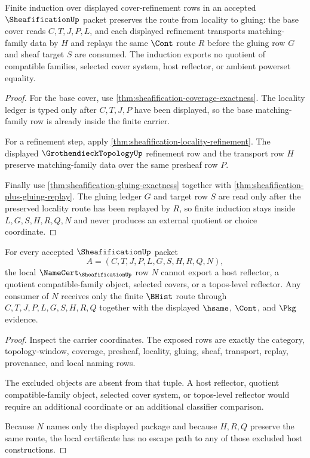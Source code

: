 \begin{theorem}
\label{thm:sheafification-local-gluing-induction}
Finite induction over displayed cover-refinement rows in an accepted $\SheafificationUp$ packet preserves the route from locality to gluing: the base cover reads $C,T,J,P,L$, and each displayed refinement transports matching-family data by $H$ and replays the same $\Cont$ route $R$ before the gluing row $G$ and sheaf target $S$ are consumed. The induction exports no quotient of compatible families, selected cover system, host reflector, or ambient powerset equality.
\end{theorem}
\begin{proof}
For the base cover, use \autoref{thm:sheafification-coverage-exactness}. The locality ledger is typed only after $C,T,J,P$ have been displayed, so the base matching-family row is already inside the finite carrier.

For a refinement step, apply \autoref{thm:sheafification-locality-refinement}. The displayed $\GrothendieckTopologyUp$ refinement row and the transport row $H$ preserve matching-family data over the same presheaf row $P$.

Finally use \autoref{thm:sheafification-gluing-exactness} together with \autoref{thm:sheafification-plus-gluing-replay}. The gluing ledger $G$ and target row $S$ are read only after the preserved locality route has been replayed by $R$, so finite induction stays inside $L,G,S,H,R,Q,N$ and never produces an external quotient or choice coordinate.
\end{proof}

\begin{theorem}
\label{thm:sheafification-local-namecert-nonescape}
For every accepted $\SheafificationUp$ packet
$$
A=(C,T,J,P,L,G,S,H,R,Q,N),
$$
the local $\NameCert_{\SheafificationUp}$ row $N$ cannot export a host reflector, a quotient compatible-family object, selected covers, or a topos-level reflector. Any consumer of $N$ receives only the finite $\BHist$ route through $C,T,J,P,L,G,S,H,R,Q$ together with the displayed $\hsame$, $\Cont$, and $\Pkg$ evidence.
\end{theorem}
\begin{proof}
Inspect the carrier coordinates. The exposed rows are exactly the category, topology-window, coverage, presheaf, locality, gluing, sheaf, transport, replay, provenance, and local naming rows.

The excluded objects are absent from that tuple. A host reflector, quotient compatible-family object, selected cover system, or topos-level reflector would require an additional coordinate or an additional classifier comparison.

Because $N$ names only the displayed package and because $H,R,Q$ preserve the same route, the local certificate has no escape path to any of those excluded host constructions.
\end{proof}

